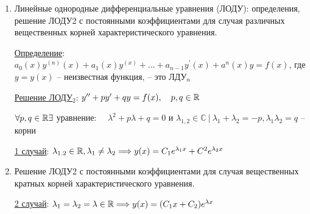 \documentclass[12pt]{article}
\begin{document}
\begin{enumerate}
        \hyperlink{differentilaequationshigherdegree}{ДУ высших порядков}:     1* Непосредственно интегрирование

        $y^{(n)} = f(x)$

        Решение: $y^{(n - 1)} = \int f(x) dx + C_1$

        $y^{(n - 2)} = \int (\int f(x) dx + C_1) dx + C_2$

        2* ДУ$_2$, не содержащие $y(x)$

        $F(x, y^\prime(x), y^{\prime\prime}(x)) = 0$

        Замена $y^\prime(x) = z(x)$, получаем:

        $F(x, z(x), z^\prime(x)) = 0$ -- ДУ$_1$

        3* ДУ$_2$, не содержащие $x$

        $F(y(x), y^\prime(x), y^{\prime\prime}(x)) = 0$

        Замена $y^\prime(x) = z(y) \quad y^{\prime\prime}(x) = \frac{dz(y(x))}{dx} = \frac{dz}{dx} \frac{dy}{dx} = z^\prime_y y^\prime = z^\prime z$


        \item Линейные однородные дифференциальные уравнения (ЛОДУ): определения, решение ЛОДУ2 с постоянными коэффициентами для случая различных вещественных корней характеристического уравнения.

        \hyperlink{lineardifferentialequationhigherdegree}{Определение}: $a_0(x) y^{(n)}(x) + a_1(x)y^{(x)} + \dots + a_{n - 1}y^\prime(x) + a^n(x)y = f(x)$, где $y = y(x)$ -- неизвестная функция, -- это ЛДУ$_n$

        \hyperlink{lineardifferentialequationseconddegreewithconstants}{Решение ЛОДУ$_2$}: $y^{\prime\prime} + p y^\prime + q y = f(x), \quad p, q \in \mathbb{R}$

        $\forall p, q \in \mathbb{R} \exists $ уравнение: $\quad \lambda^2 + p\lambda + q = 0$ и $\lambda_{1,2} \in \mathbb{C} \ | \ \lambda_1 + \lambda_2 = -p, \lambda_1 \lambda_2 = q$ -- корни

        \hyperlink{ldesgdifferentrealsolutions}{1 случай}: $\lambda_{1.2} \in \mathbb{R}, \lambda_1 \neq \lambda_2 \Longrightarrow y(x) = C_1 e^{\lambda_1 x} + C^2 e^{\lambda_2 x}$

        \item Решение ЛОДУ2 с постоянными коэффициентами для случая вещественных кратных корней характеристического уравнения.

        \hyperlink{ldesgequalrealsolutions}{2 случай}: $\lambda_1 = \lambda_2 = \lambda \in \mathbb{R} \Longrightarrow y(x) = (C_1 x + C_2)e^{\lambda x}$



\end{enumerate}
\end{document}
